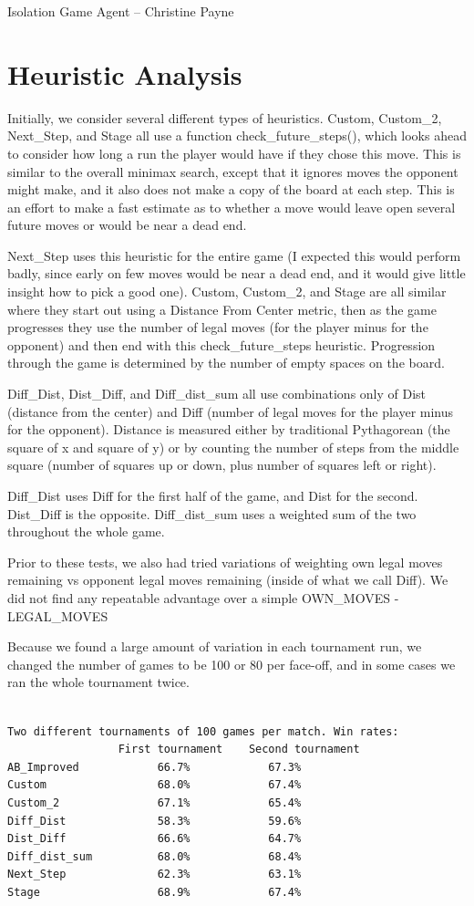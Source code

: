 \documentclass[a4paper,12pt]{article}
\begin{document}
Isolation Game Agent -- Christine Payne
\section{Heuristic Analysis}
Initially, we consider several different types of heuristics.  Custom, Custom\_2, Next\_Step, and Stage all use a function check\_future\_steps(), 
which looks ahead to consider how long a run the player would have if they chose this move.  This is similar to the overall minimax search, except that 
it ignores moves the opponent might make, and it also does not make a copy of the board at each step. This is an effort to make a fast estimate as to 
whether a move would leave open several future moves or would be near a dead end.

Next\_Step uses this heuristic for the entire game (I expected this would perform badly, since early on few moves would be near a dead end, and it would
give little insight how to pick a good one).  Custom, Custom\_2, and Stage are all similar where they start out using a Distance From Center metric, then as the 
game progresses they use the number of legal moves (for the player minus for the opponent) and then end with this check\_future\_steps\(\) heuristic.  Progression
through the game is determined by the number of empty spaces on the board.


Diff\_Dist, Dist\_Diff, and Diff\_dist\_sum all use combinations only of Dist (distance from the center) and Diff (number of legal moves for the player minus for the opponent).  Distance is measured either by traditional Pythagorean (the square of x and square of y) or by counting the number of steps from the middle
square (number of squares up or down, plus number of squares left or right).

Diff\_Dist uses Diff for the first half of the game, and Dist for the second.  Dist\_Diff is the opposite. Diff\_dist\_sum uses a weighted sum of the two
throughout the whole game.

Prior to these tests, we also had tried variations of weighting own legal moves remaining vs opponent legal moves remaining (inside of what we call Diff). We did not find any repeatable advantage over a simple OWN\_MOVES - LEGAL\_MOVES

Because we found a large amount of variation in each tournament run, we changed the number of games to be 100 or 80 per face-off, and in some cases we
ran the whole tournament twice.

\newpage
\begin{verbatim}

Two different tournaments of 100 games per match. Win rates:
                 First tournament    Second tournament
AB_Improved            66.7%            67.3%
Custom                 68.0%            67.4%
Custom_2               67.1%            65.4%
Diff_Dist              58.3%            59.6%
Dist_Diff              66.6%            64.7%
Diff_dist_sum          68.0%            68.4%
Next_Step              62.3%            63.1%
Stage                  68.9%            67.4%

  
\end{verbatim}
\end{document}
